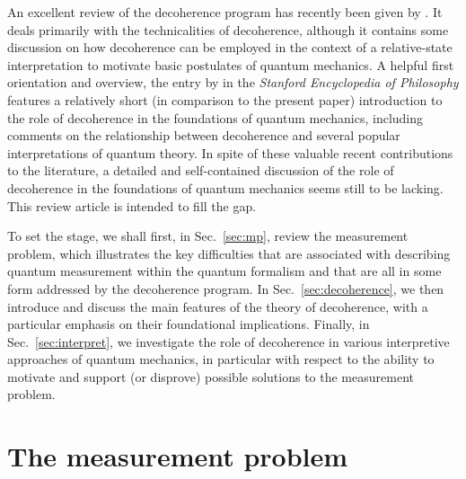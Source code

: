 \documentclass[twocolumn,rmp,aps,amsmath,amsfonts,noshowkeys,noshowpacs]{revtex4}
\begin{document}
An excellent review of the decoherence program has recently been given
by \citet{Zurek:2002:ii}. It deals primarily with the technicalities
of decoherence, although it contains some discussion on how
decoherence can be employed in the context of a relative-state
interpretation to motivate basic postulates of quantum mechanics.  A
helpful first orientation and overview, the entry by
\citet{Bacciagaluppi:2003:yz} in the {\em Stanford Encyclopedia of
  Philosophy} features a relatively short (in comparison to the
present paper) introduction to the role of decoherence in the
foundations of quantum mechanics, including comments on the
relationship between decoherence and several popular interpretations
of quantum theory.  In spite of these valuable recent contributions to
the literature, a detailed and self-contained discussion of the role
of decoherence in the foundations of quantum mechanics seems still to
be lacking. This review article is intended to fill the gap.

To set the stage, we shall first, in Sec.~\ref{sec:mp}, review the
measurement problem, which illustrates the key difficulties that are
associated with describing quantum measurement within the quantum
formalism and that are all in some form addressed by the decoherence
program. In Sec.~\ref{sec:decoherence}, we then introduce and discuss
the main features of the theory of decoherence, with a particular
emphasis on their foundational implications.  Finally, in
Sec.~\ref{sec:interpret}, we investigate the role of decoherence in
various interpretive approaches of quantum mechanics, in particular
with respect to the ability to motivate and support (or disprove)
possible solutions to the measurement problem.


\section{\label{sec:mp}The measurement problem}
\end{document}
